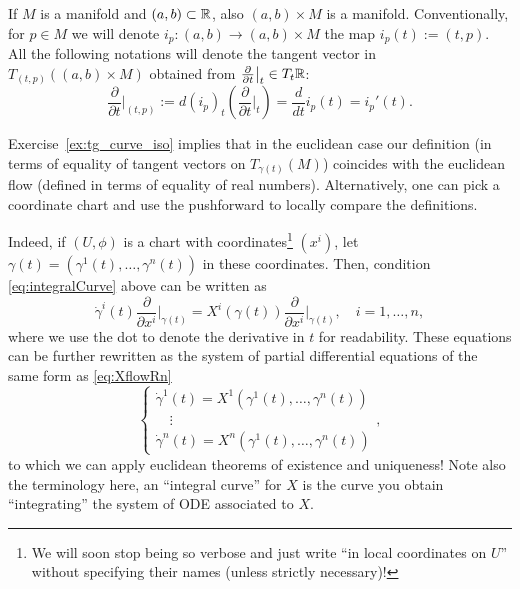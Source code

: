 \begin{example}
\end{example}

\begin{notation}
  If $M$ is a manifold and $(a,b)\subset\mathbb{R}$, also $(a,b)\times M$ is a manifold. 
  Conventionally, for $p\in M$ we will denote $i_p : (a,b) \to (a,b)\times M$ the map $i_p(t) := (t,p)$.
  All the following notations will denote the tangent vector in $T_{(t,p)}((a,b)\times M)$ obtained from $\frac{\partial}{\partial t}\big|_t \in T_t\mathbb{R}$:
  \begin{equation}
    \frac{\partial}{\partial t}\Big|_{(t,p)} := d (i_p)_t\left(\frac{\partial}{\partial t}\Big|_t\right) = \frac{d}{d t}  i_p(t) = i_p'(t).
  \end{equation}
\end{notation}

Exercise~\ref{ex:tg_curve_iso} implies that in the euclidean case our definition (in terms of equality of tangent vectors on $T_{\gamma(t)}(M)$) coincides with the euclidean flow (defined in terms of equality of real numbers).
Alternatively, one can pick a coordinate chart and use the pushforward to locally compare the definitions.

Indeed, if $(U, \phi)$ is a chart with coordinates\footnote{We will soon stop being so verbose and just write ``in local coordinates on $U$'' without specifying their names (unless strictly necessary)!} $(x^i)$, let $\gamma(t) = (\gamma^1(t), \ldots, \gamma^n(t))$ in these coordinates. Then, condition \eqref{eq:integralCurve} above can be written as
\begin{equation}
  \dot\gamma^i(t)\frac{\partial}{\partial x^i}\Big|_{\gamma(t)}
  = X^i(\gamma(t))\frac{\partial}{\partial x^i}\Big|_{\gamma(t)},\quad i=1,\ldots,n,
\end{equation}
where we use the dot to denote the derivative in $t$ for readability.
These equations can be further rewritten as the system of partial differential equations of the same form as \eqref{eq:XflowRn}
\begin{equation}
  \begin{cases}
    \dot\gamma^1(t) = X^1(\gamma^1(t), \ldots, \gamma^n(t)) \\
    \quad \vdots \\
    \dot\gamma^n(t) = X^n(\gamma^1(t), \ldots, \gamma^n(t))
  \end{cases},
\end{equation}
to which we can apply euclidean theorems of existence and uniqueness!
Note also the terminology here, an ``integral curve'' for $X$ is the curve you obtain ``integrating'' the system of ODE associated to $X$.

